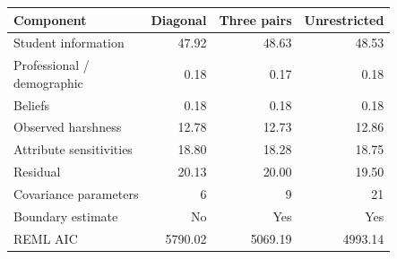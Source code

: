 \begin{tabular}{p{4.9cm}rrr}
\toprule
Component & Diagonal & Three pairs & Unrestricted \\
\midrule
Student information & 47.92 & 48.63 & 48.53 \\
\shortstack[l]{Professional /\\demographic} & 0.18 & 0.17 & 0.18 \\
Beliefs & 0.18 & 0.18 & 0.18 \\
Observed harshness & 12.78 & 12.73 & 12.86 \\
Attribute sensitivities & 18.80 & 18.28 & 18.75 \\
Residual & 20.13 & 20.00 & 19.50 \\
Covariance parameters & 6 & 9 & 21 \\
Boundary estimate & No & Yes & Yes \\
REML AIC & 5790.02 & 5069.19 & 4993.14 \\
\bottomrule
\end{tabular}
